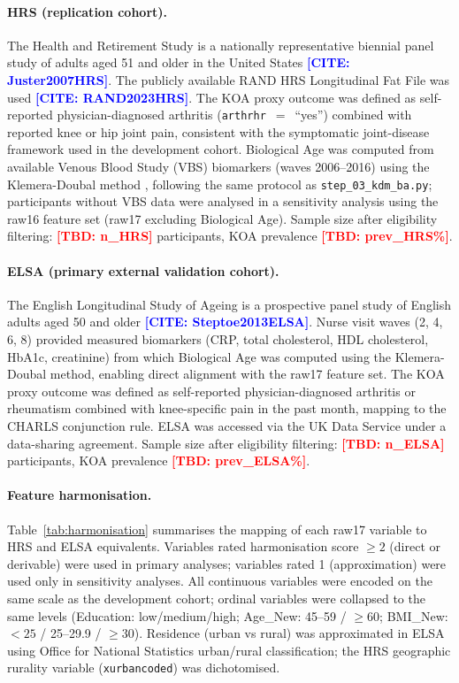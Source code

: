 \documentclass[11pt,a4paper]{article}
\newcommand{\TBD}[1]{\textcolor{red}{\textbf{[TBD: #1]}}}
\newcommand{\CITE}[1]{\textcolor{blue}{\textbf{[CITE: #1]}}}
\begin{document}
\paragraph{HRS (replication cohort).}
The Health and Retirement Study is a nationally representative biennial panel study of adults aged 51 and older in the United States \CITE{Juster2007HRS}. The publicly available RAND HRS Longitudinal Fat File was used \CITE{RAND2023HRS}. The KOA proxy outcome was defined as self-reported physician-diagnosed arthritis (\texttt{arthrhr}~$=$~``yes'') combined with reported knee or hip joint pain, consistent with the symptomatic joint-disease framework used in the development cohort. Biological Age was computed from available Venous Blood Study (VBS) biomarkers (waves 2006--2016) using the Klemera-Doubal method \cite{Klemera2006}, following the same protocol as \texttt{step\_03\_kdm\_ba.py}; participants without VBS data were analysed in a sensitivity analysis using the raw16 feature set (raw17 excluding Biological Age). Sample size after eligibility filtering: \TBD{n\_HRS} participants, KOA prevalence \TBD{prev\_HRS\%}.

\paragraph{ELSA (primary external validation cohort).}
The English Longitudinal Study of Ageing is a prospective panel study of English adults aged 50 and older \CITE{Steptoe2013ELSA}. Nurse visit waves (2, 4, 6, 8) provided measured biomarkers (CRP, total cholesterol, HDL cholesterol, HbA1c, creatinine) from which Biological Age was computed using the Klemera-Doubal method, enabling direct alignment with the raw17 feature set. The KOA proxy outcome was defined as self-reported physician-diagnosed arthritis or rheumatism combined with knee-specific pain in the past month, mapping to the CHARLS conjunction rule. ELSA was accessed via the UK Data Service under a data-sharing agreement. Sample size after eligibility filtering: \TBD{n\_ELSA} participants, KOA prevalence \TBD{prev\_ELSA\%}.

\paragraph{Feature harmonisation.}
Table~\ref{tab:harmonisation} summarises the mapping of each raw17 variable to HRS and ELSA equivalents. Variables rated harmonisation score $\geq 2$ (direct or derivable) were used in primary analyses; variables rated 1 (approximation) were used only in sensitivity analyses. All continuous variables were encoded on the same scale as the development cohort; ordinal variables were collapsed to the same levels (Education: low/medium/high; Age\_New: 45--59 / $\geq 60$; BMI\_New: $<25$ / 25--29.9 / $\geq 30$). Residence (urban vs rural) was approximated in ELSA using Office for National Statistics urban/rural classification; the HRS geographic rurality variable (\texttt{xurbancoded}) was dichotomised.
\end{document}
